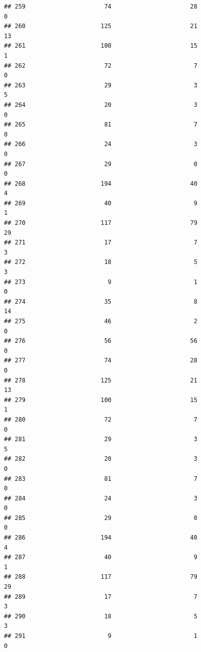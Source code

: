 \documentclass[
]{article}
\begin{document}
\begin{verbatim}
## 259                      74                      28                        0
## 260                     125                      21                       13
## 261                     100                      15                        1
## 262                      72                       7                        0
## 263                      29                       3                        5
## 264                      20                       3                        0
## 265                      81                       7                        0
## 266                      24                       3                        0
## 267                      29                       0                        0
## 268                     194                      40                        4
## 269                      40                       9                        1
## 270                     117                      79                       29
## 271                      17                       7                        3
## 272                      18                       5                        3
## 273                       9                       1                        0
## 274                      35                       8                       14
## 275                      46                       2                        0
## 276                      56                      56                        0
## 277                      74                      28                        0
## 278                     125                      21                       13
## 279                     100                      15                        1
## 280                      72                       7                        0
## 281                      29                       3                        5
## 282                      20                       3                        0
## 283                      81                       7                        0
## 284                      24                       3                        0
## 285                      29                       0                        0
## 286                     194                      40                        4
## 287                      40                       9                        1
## 288                     117                      79                       29
## 289                      17                       7                        3
## 290                      18                       5                        3
## 291                       9                       1                        0

\end{verbatim}
\end{document}
